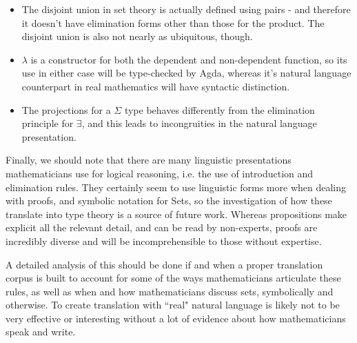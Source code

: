 \begin{itemize}
\item The disjoint union in set theory is actually defined using 
pairs - and therefore it doesn't have elimination forms other than those
for the product. The disjoint union is also not nearly as ubiquitous, though.
\item $\lambda$ is a constructor for both the dependent and
non-dependent function, so its use in either case will be type-checked by Agda,
whereas it's natural language counterpart in real mathematics will have
syntactic distinction.
\item The projections for a $\Sigma$ type behaves differently from the
elimination principle for $\exists$, and this leads to
incongruities in the natural language presentation.
\end{itemize}

Finally, we should note that there are many linguistic presentations
mathematicians use for logical reasoning, i.e. the use of introduction and
elimination rules. They certainly seem to use linguistic forms more when dealing
with proofs, and symbolic notation for Sets, so the investigation of how these
translate into type theory is a source of future work. Whereas propositions make
explicit all the relevant detail, and can be read by non-experts, proofs are
incredibly diverse and will be incomprehensible to those without expertise. 

A detailed analysis of this should be done if and when a proper translation
corpus is built to account for some of the ways mathematicians articulate these
rules, as well as when and how mathematicians discuss sets,
symbolically and otherwise. To create translation with ``real" natural language 
is likely not to be very effective or interesting without a lot of evidence about
how mathematicians speak and write.